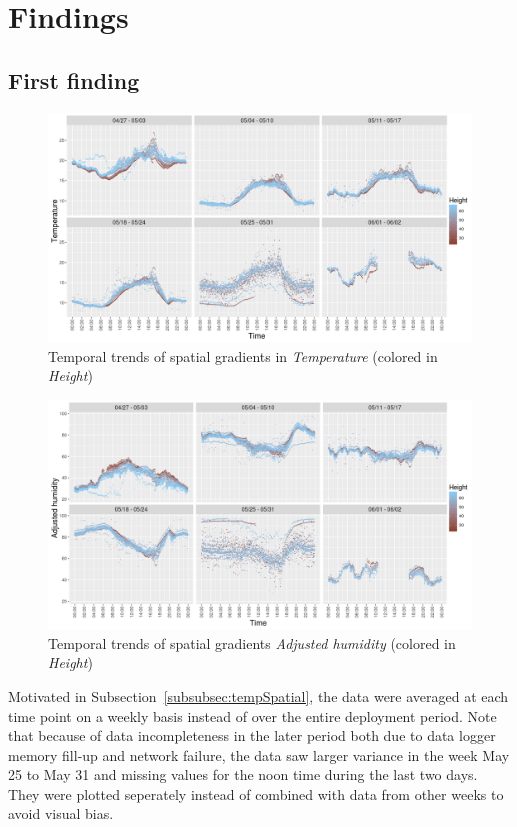 \documentclass[11pt]{article}
\begin{document}
\section{Findings}


\subsection{First finding}
\label{subsec:firstFind}
\begin{figure}[!h]
  \centering
    \includegraphics[width=.9\textwidth, height=.42\textwidth]{../figures/tempTemporal.png}
  \caption{Temporal trends of spatial gradients in \textit{Temperature} (colored in \textit{Height})}
  \label{fig:tempTemporal}
\end{figure}
\begin{figure}[!h]
  \centering
    \includegraphics[width=.9\textwidth, height=.42\textwidth]{../figures/humidTemporal.png}
  \caption{Temporal trends of spatial gradients \textit{Adjusted humidity} (colored in \textit{Height})}
  \label{fig:humidTemporal}
\end{figure}
Motivated in Subsection~\ref{subsubsec:tempSpatial}, the data were averaged at each time point on a weekly basis instead of over the entire deployment period. Note that because of data incompleteness in the later period both due to data logger memory fill-up and network failure, the data saw larger variance in the week May 25 to May 31 and missing values for the noon time during the last two days. They were plotted seperately instead of combined with data from other weeks to avoid visual bias.\\
\end{document}
